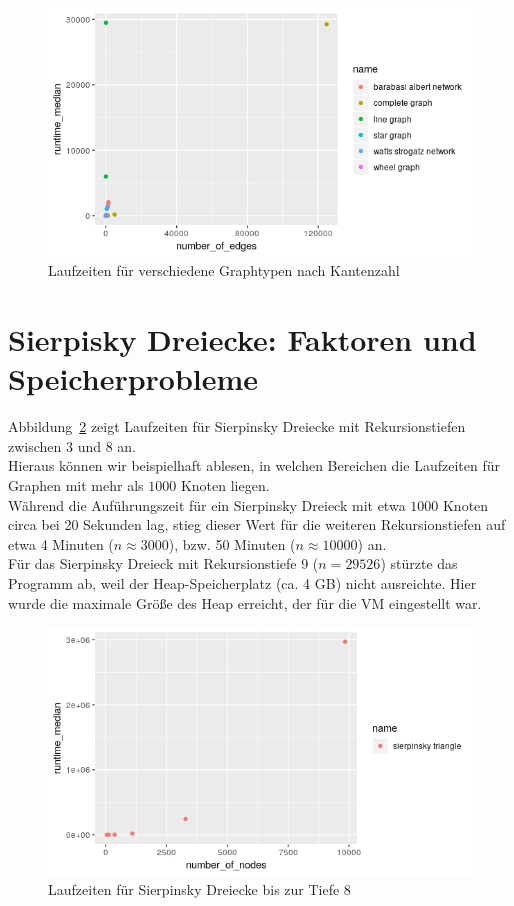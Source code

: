 \documentclass[]{article}
\begin{document}
\begin{figure}
    \centering
	\includegraphics[width=1\textwidth]{standard_benchmarks_edges.jpeg}
    \caption{Laufzeiten für verschiedene Graphtypen nach Kantenzahl}
    \label{fig:graphs-edges}
\end{figure}

\section{Sierpisky Dreiecke: Faktoren und Speicherprobleme}

Abbildung~\ref{fig:sierpisky} zeigt Laufzeiten für Sierpinsky Dreiecke mit Rekursionstiefen zwischen 3 und 8 an. \\
Hieraus können wir beispielhaft ablesen, in welchen Bereichen die Laufzeiten für Graphen mit mehr als $1000$ Knoten liegen. \\
Während die Auführungszeit für ein Sierpinsky Dreieck mit etwa $1000$ Knoten circa bei 20 Sekunden lag, stieg dieser Wert für die weiteren Rekursionstiefen auf etwa 4 Minuten ($n \approx 3000$), bzw. 50 Minuten ($n \approx 10000$) an. \\

Für das Sierpinsky Dreieck mit Rekursionstiefe 9 ($n = 29526$) stürzte das Programm ab, weil der Heap-Speicherplatz (ca. 4 GB) nicht ausreichte. Hier wurde die maximale Größe des Heap erreicht, der für die VM eingestellt war. \\

\begin{figure}
    \centering
	\includegraphics[width=1\textwidth]{sierpinsky.jpeg}
    \caption{Laufzeiten für Sierpinsky Dreiecke bis zur Tiefe 8}
    \label{fig:sierpisky}
\end{figure}
\end{document}
